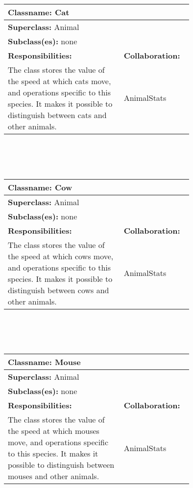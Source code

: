 \documentclass{article}
\begin{document}
\\ \\ \\
\begin{tabular}{|p{0.55\linewidth}|p{0.2\linewidth}|}
\hline
\multicolumn{2}{|l|}{\textbf{Classname:} Cat} \\
\hline
\multicolumn{2}{|l|}{\textbf{Superclass:} Animal} \\
\multicolumn{2}{|l|}{\textbf{Subclass(es):} none} \\
\hline
\textbf{Responsibilities:}  &  \textbf{Collaboration:} \\
The class stores the value of the speed at which cats move, and operations specific to this species. It makes it possible to distinguish between cats and other animals. & AnimalStats \\
%
\hline
\end{tabular}
\\ \\ \\
\begin{tabular}{|p{0.55\linewidth}|p{0.2\linewidth}|}
\hline
\multicolumn{2}{|l|}{\textbf{Classname:} Cow} \\
\hline
\multicolumn{2}{|l|}{\textbf{Superclass:} Animal} \\
\multicolumn{2}{|l|}{\textbf{Subclass(es):} none} \\
\hline
\textbf{Responsibilities:}  &  \textbf{Collaboration:} \\
The class stores the value of the speed at which cows move, and operations specific to this species. It makes it possible to distinguish between cows and other animals. & AnimalStats \\
\hline
\end{tabular}
\\ \\ \\
\begin{tabular}{|p{0.55\linewidth}|p{0.2\linewidth}|}
\hline
\multicolumn{2}{|l|}{\textbf{Classname:} Mouse} \\
\hline
\multicolumn{2}{|l|}{\textbf{Superclass:} Animal} \\
\multicolumn{2}{|l|}{\textbf{Subclass(es):} none} \\
\hline
\textbf{Responsibilities:}  &  \textbf{Collaboration:} \\
The class stores the value of the speed at which mouses move, and operations specific to this species. It makes it possible to distinguish between mouses and other animals. & AnimalStats \\
\hline
\end{tabular}
\end{document}

